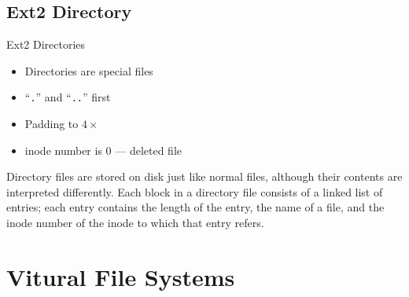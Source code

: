 \subsection{Ext2 Directory}
\label{sec:ext2-directory}

\begin{frame}{Ext2 Directories}
  \begin{center}
  \end{center}
  \begin{minipage}{.39\textwidth}
    \begin{center}
    \end{center}
  \end{minipage}\hfill
  \begin{minipage}{.55\textwidth}
    \begin{itemize}
    \item Directories are special files
    \item ``\texttt{.}'' and ``\texttt{..}'' first
    \item Padding to $4\times{}$
    \item inode number is 0 --- deleted file
    \end{itemize}
  \end{minipage}
\end{frame}

Directory files are stored on disk just like normal files, although their contents are
interpreted differently. Each block in a directory file consists of a linked list of
entries; each entry contains the length of the entry, the name of a file, and the inode
number of the inode to which that entry refers.

\section{Vitural File Systems}

